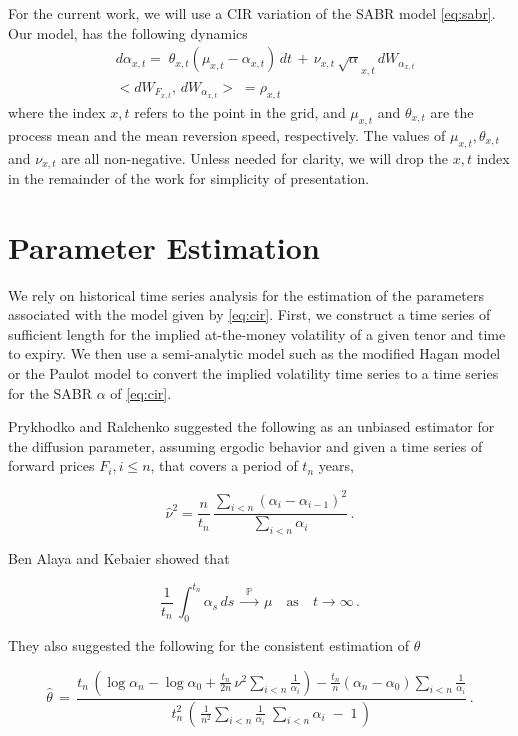 \documentclass[12pt,oneside]{article}
\newcommand{\beqn}{\begin{equation}}
\newcommand{\eeqn}{\end{equation}}
\numberwithin{equation}{section}
\begin{document}
For the current work, we will use a CIR variation of
the SABR model \eqref{eq:sabr}.
Our model, has the following dynamics
\beqn\label{eq:cir}
\begin{aligned}
&d\alpha_{x,t} =\;\theta_{x,t}(\mu_{x,t} - \alpha_{x,t})\,dt\,+\, \nu_{x,t}\,\sqrt\alpha_{x,t}\, dW_{\alpha_{x,t}}\\
&<\!dW_{F_{x,t}},\, dW_{\alpha_{x,t}}\!> \;=\rho_{x,t}
\end{aligned}
\eeqn
where the index $x,t$ refers to the point in the grid,
and $\mu_{x,t}$ and $\theta_{x,t}$ are the process mean and
the mean reversion speed, respectively.
The values of $\mu_{x,t}, \theta_{x,t}$ and $\nu_{x,t}$ are all non-negative.
Unless needed for clarity, we will drop the $x,t$ index in the remainder of the work for simplicity of presentation.

\section{Parameter Estimation}
We rely on historical time series analysis for 
the estimation of the parameters associated with the model given by \eqref{eq:cir}.
First, we construct a time series of sufficient length for the implied at-the-money volatility
of a given tenor and time to expiry.
We then use a semi-analytic model such as the modified Hagan model \cite{HKLW} or the Paulot \cite{P} model
to convert
the implied volatility time series to a time series for the SABR $\alpha$ of \eqref{eq:cir}.

Prykhodko and Ralchenko \cite{PR} suggested the following as an unbiased estimator for the diffusion parameter,
assuming ergodic behavior and given a time series of forward prices $F_i, i\le n$,
that covers a period of $t_n$ years,

\beqn
\hat{\nu}^2 = \frac{n}{t_n}\,\frac{\sum_{i<n} (\alpha_i-\alpha_{i-1})^2}{\sum_{i<n}\alpha_i}\,.
\eeqn

Ben Alaya and Kebaier \cite{BK} showed that

\beqn
\frac{1}{t_n}\,\int_0^{t_n} \alpha_s \,ds\,\xrightarrow{\;\;\mathbb{P}\;\;}\,\mu\quad \text{as} \quad t\!\longrightarrow\!\infty\,.
\eeqn

They also suggested the following for the consistent estimation of $\theta$

\beqn
\hat{\theta}\,=\,\frac{t_n\,(\log{\alpha_n}-\log{\alpha_0}+\frac{t_n}{2n}\,\nu^2\sum_{i<n}\frac{1}{\alpha_i})-\frac{t_n}{n}(\alpha_n-\alpha_0)\sum_{i<n}\frac{1}{\alpha_i}}
{t_n^2\,(\,\frac{1}{n^2}\sum_{i<n}\!\frac{1}{\alpha_i}\;\sum_{i<n}\!\alpha_i\;-\;1\,)}\,.
\eeqn
\end{document}
